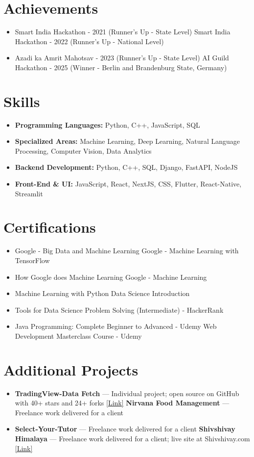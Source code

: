 \documentclass[a4paper,10pt]{article}
\begin{document}
\section*{Achievements}
\begin{itemize}
\item Smart India Hackathon - 2021 (Runner's Up - State Level) \hfill Smart India Hackathon - 2022 (Runner's Up - National Level)
\item Azadi ka Amrit Mahotsav - 2023 (Runner's Up - State Level) \hfill AI Guild Hackathon - 2025 (Winner - Berlin and Brandenburg State, Germany)
\end{itemize}

\section*{Skills}
\begin{itemize}
  \item \textbf{Programming Languages:} Python, C++, JavaScript, SQL
  \item \textbf{Specialized Areas:} Machine Learning, Deep Learning, Natural Language Processing, Computer Vision, Data Analytics
  \item \textbf{Backend Development:} Python, C++, SQL, Django, FastAPI, NodeJS
  \item \textbf{Front-End \& UI:} JavaScript, React, NextJS, CSS, Flutter, React-Native, Streamlit
\end{itemize}

\section*{Certifications}
\begin{itemize}
\item Google - Big Data and Machine Learning \hfill Google - Machine Learning with TensorFlow
\item How Google does Machine Learning \hfill Google - Machine Learning
\item Machine Learning with Python \hfill Data Science Introduction
\item Tools for Data Science \hfill Problem Solving (Intermediate) - HackerRank
\item Java Programming: Complete Beginner to Advanced - Udemy \hfill Web Development Masterclass Course - Udemy
\end{itemize}

\section*{Additional Projects}
\begin{itemize}
\item \textbf{TradingView-Data Fetch} — Individual project; open source on GitHub with 40+ stars and 24+ forks \href{https://github.com/ravalmeet/TradingView}{[Link]} \hfill \textbf{Nirvana Food Management} — Freelance work delivered for a client
\item \textbf{Select-Your-Tutor} — Freelance work delivered for a client \hfill \textbf{Shivshivay Himalaya} — Freelance work delivered for a client; live site at Shivshivay.com \href{Shivshivay.com}{[Link]}
\end{itemize}
\end{document}
